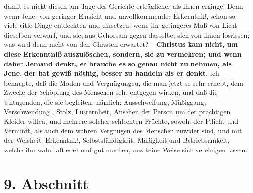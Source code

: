 damit es nicht diesen am Tage des Gerichte erträglicher als ihnen erginge! Denn
wenn Jene, von geringer Einsicht und unvollkommender Erkenntniß, schon so viele
eitle Dinge entdeckten und einsetzen; wenn ihr geringeres Maß von Licht
dieselben verwarf, und sie, aus Gehorsam gegen dasselbe, sich von ihnen
losrissen; was wird denn nicht von den Christen erwartet? --
\label{ref:14_08_wahre_nachfolger_rational}
\textbf{Christus kam nicht,
um diese Erkenntniß auszulöschen, sondern, sie zu vermehren; und wenn daher
Jemand denkt, er brauche es so genau nicht zu nehmen, als Jene, der hat gewiß
nöthig, besser zu handeln als er denkt.} Ich behaupte, daß die Moden und
Vergnügungeu, die man jetzt so sehr erhebt, dem Zwecke der Schöpfung des
Menschen sehr entgegen wirken, und daß die Untugenden, die sie begleiten,
nämlich: Ausschweifung, Müßiggang, Verschwendung , Stolz, Lüsternheit, Ansehen
der Person um der prächtigen Kleider willen, und mehrere solcher schlechten
Früchte, sowohl der Pflicht und Vernunft, als auch dem wahren Vergnügen des
Menschen zuwider sind, und mit der Weisheit, Erkenntniß, Selbstständigkeit,
Mäßigkeit und Betriebsamkeit, welche ihn wahrhaft edel und gut machen, aus keine
Weise sich vereinigen lassen.

\section{9. Abschnitt} \label{kap14_ab9}

